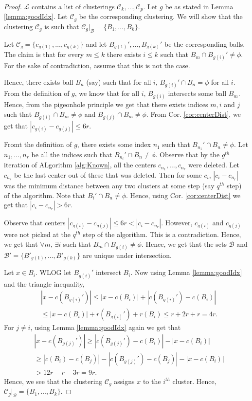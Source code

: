 \documentclass[twoside]{article}
\newcommand{\mc}{\mathcal}
\begin{document}
\begin{proof}
$\mc L$ contains a list of clusterings $\mc C_k,\ldots,\mc C_p$. Let $g$ be as stated in Lemma \ref{lemma:goodIdx}. Let $\mc C_g$ be the corresponding clustering. We will show that the clustering $\mc C_g$ is such that $\mc C_g|_{\mc B} = \{B_1,\ldots,B_k\}$. 

Let $\mc C_g = \{c_{g(1)},\ldots,c_{g(k)}\}$ and let $B_{g(1)}',\ldots,B_{g(k)}'$ be the corresponding balls. The claim is that for every $m \le k$ there exists $i \le k$ such that $B_m \cap B_{g(i)}' \neq \phi$. For the sake of contradiction, assume that this is not the case. 

Hence, there exists ball $B_n$ (say) such that for all $i$, $B_{g(i)}' \cap B_n = \phi$ for all $i$. From the definition of $g$, we know that for all $i$, $B_{g(i)}$ intersects some ball $B_m$. Hence, from the pigeonhole principle we get that there exists indices $m, i$ and $j$ such that $B_{g(i)} \cap B_m \neq \phi$ and $B_{g(j)} \cap B_m \neq \phi$. From Cor. \ref{cor:centerDist}, we get that $|c_{g(i)}-c_{g(j)}| \le 6r$.

Fromt the definition of $g$, there exists some index $n_1$ such that $B_{n_1}' \cap B_n \neq \phi$. Let $n_1, \ldots, n_r$ be all the indices such that $B_{n_i}' \cap B_n \neq \phi$. Observe that by the $g^{th}$ iteration of ALgorithm \ref{alg:Known}, all the centers $c_{n_1}, \ldots, c_{n_r}$ were deleted. Let $c_{n_r}$ be the last center out of these that was deleted. Then for some $c_i$, $|c_i - c_{n_r}|$ was the minimum distance between any two clusters at some step (say $q^{th}$ step) of the algorithm. Note that $B_i' \cap B_n \neq \phi$. Hence, using Cor. \ref{cor:centerDist} we get that $|c_i - c_{n_r}| > 6r$. 

Observe that centers $|c_{g(i)}-c_{g(j)}| \le 6r < |c_i - c_{n_r}|$. However, $c_{g(i)}$ and $c_{g(j)}$ were not picked at the $q^{th}$ step of the algorithm. This is a contradiction. Hence, we get that $\forall m$, $\exists i$ such that $B_m \cap B_{g(i)} \neq \phi$. Hence, we get that the sets $\mc B$ and $\mc B' = \{B'_{g(1)}, \ldots, B'_{g(k)}\}$ are unique under intersection.

Let $x \in B_i$. WLOG let $B_{g(i)}'$ intersect $B_i$. Now using Lemma \ref{lemma:goodIdx} and the triangle inequality,
\begin{align*}
&|x-c(B_{g(i)}')| \le |x-c(B_i)| + |c(B_{g(i)}')-c(B_i)| \\
&\le |x-c(B_i)| + r(B_{g(i)}')+ r(B_i) \le r+ 2r + r = 4r.
\end{align*} 
For $j \neq i$, using Lemma \ref{lemma:goodIdx} again we get that
\begin{align*} 
&|x-c(B_{g(j)}')| \ge |c(B_{g(j)}')-c(B_i)| - |x-c(B_i)|\\
& \ge |c(B_i)-c(B_j)| - |c(B_{g(j)}')-c(B_j)| - |x-c(B_i)| \\
&> 12r - r -3r = 9r.
\end{align*} 
Hence, we see that the clustering $\mc C_g$ assigns $x$ to the $i^{th}$ cluster. Hence, $\mc C_g|_\mc B = \{B_1,\ldots,B_k\}$.
\end{proof}
\end{document}
